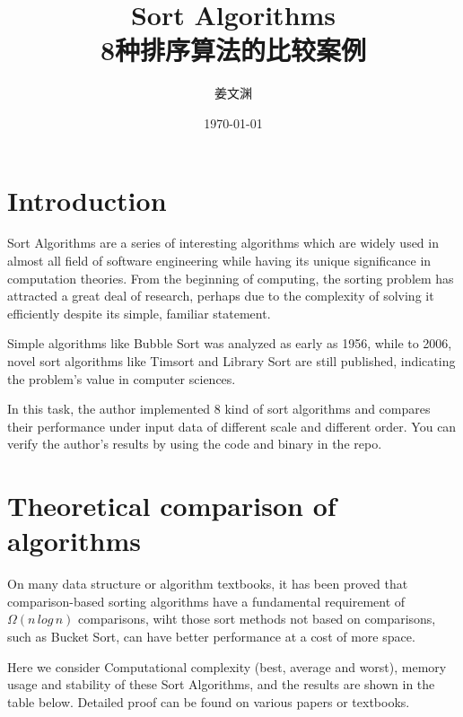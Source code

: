 \documentclass[cn,black,12pt,normal]{elegantnote}
\title{Sort Algorithms\\8种排序算法的比较案例}
\author{姜文渊}
\institute{School of Software Engineering, Tongji University}
\date{\today}
\newcommand{\uct}[1]{\textsuperscript{\textsuperscript{\cite{#1}}}}
\begin{document}
\maketitle

\section{Introduction}

Sort Algorithms are a series of interesting algorithms which are widely used in almost all field of software engineering while having its unique significance in computation theories. From the beginning of computing, the sorting problem has attracted a great deal of research, perhaps due to the complexity of solving it efficiently despite its simple, familiar statement.

Simple algorithms like Bubble Sort was analyzed as early as 1956\uct{demuth1957electronic}, while to 2006, novel sort algorithms like Timsort and Library Sort are still published, indicating the problem's value in computer sciences.\uct{auger2015merge}

In this task, the author implemented 8 kind of sort algorithms and compares their performance under input data of different scale and different order. You can verify the author's results by using the code and binary in the repo.

\section{Theoretical comparison of algorithms}

On many data structure or algorithm textbooks, it has been proved that comparison-based sorting algorithms have a fundamental requirement of $\Omega(n \, log \, n) $ comparisons,\uct{cormen2009introduction} wiht those sort methods not based on comparisons, such as Bucket Sort, can have better performance at a cost of more space.

Here we consider Computational complexity (best, average and worst), memory usage and stability of these Sort Algorithms, and the results are shown in the table below. Detailed proof can be found on various papers or textbooks.
\end{document}
